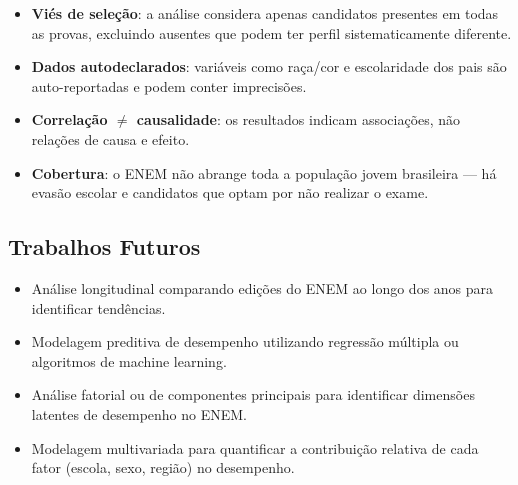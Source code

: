 \documentclass[a4paper,12pt]{article}
\begin{document}
\begin{itemize}
    \item \textbf{Viés de seleção}: a análise considera apenas candidatos presentes em todas as provas, excluindo ausentes que podem ter perfil sistematicamente diferente.
    \item \textbf{Dados autodeclarados}: variáveis como raça/cor e escolaridade dos pais são auto-reportadas e podem conter imprecisões.
    \item \textbf{Correlação $\neq$ causalidade}: os resultados indicam associações, não relações de causa e efeito.
    \item \textbf{Cobertura}: o ENEM não abrange toda a população jovem brasileira — há evasão escolar e candidatos que optam por não realizar o exame.
\end{itemize}

\subsection{Trabalhos Futuros}

\begin{itemize}
    \item Análise longitudinal comparando edições do ENEM ao longo dos anos para identificar tendências.
    \item Modelagem preditiva de desempenho utilizando regressão múltipla ou algoritmos de machine learning.
    \item Análise fatorial ou de componentes principais para identificar dimensões latentes de desempenho no ENEM.
    \item Modelagem multivariada para quantificar a contribuição relativa de cada fator (escola, sexo, região) no desempenho.
\end{itemize}
\end{document}
